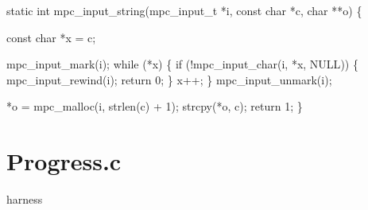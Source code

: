 \documentclass[
  a4paper,
]{scrreprt}
\newenvironment{Shaded}{\begin{snugshade}}{\end{snugshade}}
\newcommand{\ControlFlowTok}[1]{\textcolor[rgb]{0.85,0.12,0.09}{#1}}
\newcommand{\DataTypeTok}[1]{\textcolor[rgb]{0.47,0.16,0.63}{#1}}
\newcommand{\DecValTok}[1]{\textcolor[rgb]{0.47,0.16,0.63}{#1}}
\newcommand{\NormalTok}[1]{\textcolor[rgb]{0.33,0.33,0.33}{#1}}
\newcommand{\OperatorTok}[1]{\textcolor[rgb]{0.00,0.46,0.62}{#1}}
\theoremstyle{definition}
\theoremstyle{remark}
\begin{document}
\begin{Shaded}
\begin{Highlighting}[numbers=left,,]

\DataTypeTok{static} \DataTypeTok{int}\NormalTok{ mpc\_input\_string}\OperatorTok{(}\NormalTok{mpc\_input\_t }\OperatorTok{*}\NormalTok{i}\OperatorTok{,} \DataTypeTok{const} \DataTypeTok{char} \OperatorTok{*}\NormalTok{c}\OperatorTok{,} \DataTypeTok{char} \OperatorTok{**}\NormalTok{o}\OperatorTok{)} \OperatorTok{\{}

  \DataTypeTok{const} \DataTypeTok{char} \OperatorTok{*}\NormalTok{x }\OperatorTok{=}\NormalTok{ c}\OperatorTok{;}

\NormalTok{  mpc\_input\_mark}\OperatorTok{(}\NormalTok{i}\OperatorTok{);}
  \ControlFlowTok{while} \OperatorTok{(*}\NormalTok{x}\OperatorTok{)} \OperatorTok{\{}
    \ControlFlowTok{if} \OperatorTok{(!}\NormalTok{mpc\_input\_char}\OperatorTok{(}\NormalTok{i}\OperatorTok{,} \OperatorTok{*}\NormalTok{x}\OperatorTok{,}\NormalTok{ NULL}\OperatorTok{))} \OperatorTok{\{}
\NormalTok{      mpc\_input\_rewind}\OperatorTok{(}\NormalTok{i}\OperatorTok{);}
      \ControlFlowTok{return} \DecValTok{0}\OperatorTok{;}
    \OperatorTok{\}}
\NormalTok{    x}\OperatorTok{++;}
  \OperatorTok{\}}
\NormalTok{  mpc\_input\_unmark}\OperatorTok{(}\NormalTok{i}\OperatorTok{);}

  \OperatorTok{*}\NormalTok{o }\OperatorTok{=}\NormalTok{ mpc\_malloc}\OperatorTok{(}\NormalTok{i}\OperatorTok{,}\NormalTok{ strlen}\OperatorTok{(}\NormalTok{c}\OperatorTok{)} \OperatorTok{+} \DecValTok{1}\OperatorTok{);}
\NormalTok{  strcpy}\OperatorTok{(*}\NormalTok{o}\OperatorTok{,}\NormalTok{ c}\OperatorTok{);}
  \ControlFlowTok{return} \DecValTok{1}\OperatorTok{;}
\OperatorTok{\}}
\end{Highlighting}
\end{Shaded}

\section{Progress.c}\label{progress.c}

harness
\end{document}
